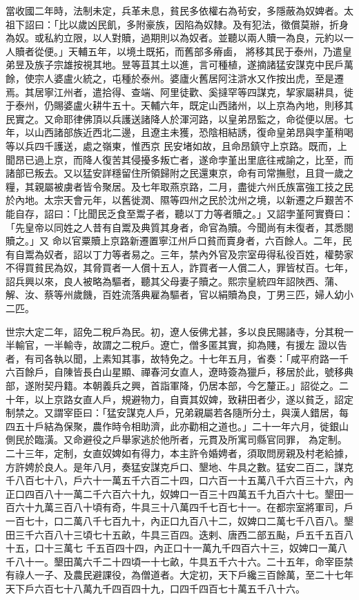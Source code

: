 \begin{pinyinscope}
 當收國二年時，法制未定，兵革未息，貧民多依權右為茍安，多隱蔽為奴婢者。太祖下詔曰：「比以歲凶民飢，多附豪族，因陷為奴隸。及有犯法，徵償莫辦，折身為奴。或私約立限，以人對贖，過期則以為奴者。並聽以兩人贖一為良，元約以一人贖者從便。」天輔五年，以境土既拓，而舊部多瘠鹵，
 將移其民于泰州，乃遣皇弟昱及族子宗雄按視其地。昱等苴其土以進，言可種植，遂摘諸猛安謀克中民戶萬餘，使宗人婆盧火統之，屯種於泰州。婆廬火舊居阿注滸水又作按出虎，至是遷焉。其居寧江州者，遣拾得、查端、阿里徒歡、奚撻罕等四謀克，挈家屬耕具，徙于泰州，仍賜婆盧火耕牛五十。天輔六年，既定山西諸州，以上京為內地，則移其民實之。又命耶律佛頂以兵護送諸降人於渾河路，以皇弟昂監之，命從便以居。七年，以山西諸部族近西北二邊，且遼主未獲，恐陰相結誘，復命皇弟昂與孛堇稍喝等以兵四千護送，處之嶺東，惟西京
 民安堵如故，且命昂鎮守上京路。既而，上聞昂已過上京，而降人復苦其侵擾多叛亡者，遂命孛堇出里底往戒諭之，比至，而諸部已叛去。又以猛安詳穩留住所領歸附之民還東京，命有司常撫慰，且貸一歲之糧，其親屬被虜者皆令聚居。及七年取燕京路，二月，盡徙六州氏族富強工技之民於內地。太宗天會元年，以舊徙潤、隰等四州之民於沈州之境，以新遷之戶艱苦不能自存，詔曰：「比聞民乏食至鬻子者，聽以丁力等者贖之。」又詔孛堇阿實賚曰：「先皇帝以同姓之人昔有自鬻及典質其身者，命官為贖。今聞尚有未復者，其悉閱贖之。」又
 命以官粟贖上京路新遷置寧江州戶口貧而賣身者，六百餘人。二年，民有自鬻為奴者，詔以丁力等者易之。三年，禁內外官及宗室毋得私役百姓，權勢家不得買貧民為奴，其脅買者一人償十五人，詐買者一人償二人，罪皆杖百。七年，詔兵興以來，良人被略為驅者，聽其父母妻子贖之。熙宗皇統四年詔陜西、蒲、解、汝、蔡等州歲饑，百姓流落典雇為驅者，官以絹贖為良，丁男三匹，婦人幼小二匹。



 世宗大定二年，詔免二稅戶為民。初，遼人佞佛尤甚，多以良民賜諸寺，分其稅一半輸官，一半輸寺，故謂之二稅戶。遼亡，僧多匿其實，抑為賤，有援左
 證以告者，有司各執以聞，上素知其事，故特免之。十七年五月，省奏：「咸平府路一千六百餘戶，自陳皆長白山星顯、禪春河女直人，遼時簽為獵戶，移居於此，號移典部，遂附契丹籍。本朝義兵之興，首詣軍降，仍居本部，今乞釐正。」詔從之。二十年，以上京路女直人戶，規避物力，自賣其奴婢，致耕田者少，遂以貧乏，詔定制禁之。又謂宰臣曰：「猛安謀克人戶，兄弟親屬若各隨所分土，與漢人錯居，每四五十戶結為保聚，農作時令相助濟，此亦勸相之道也。」二十一年六月，徙銀山側民於臨潢。又命避役之戶舉家逃於他所者，元貫及所寓司縣官同罪，
 為定制。二十三年，定制，女直奴婢如有得力，本主許令婚娉者，須取問房親及村老給據，方許娉於良人。是年八月，奏猛安謀克戶口、墾地、牛具之數。猛安二百二，謀克千八百七十八，戶六十一萬五千六百二十四，口六百一十五萬八千六百三十六，內正口四百八十一萬二千六百六十九，奴婢口一百三十四萬五千九百六十七。墾田一百六十九萬三百八十頃有奇，牛具三十八萬四千七百七十一。在都宗室將軍司，戶一百七十，口二萬八千七百九十，內正口九百八十二，奴婢口二萬七千八百八。墾田三千六百八十三頃七十五畝，牛具三百四。迭剌、唐西二部五颭，戶五千五百八十五，口十三萬七
 千五百四十四，內正口十一萬九千四百六十三，奴婢口一萬八千八十一。墾田萬六千二十四頃一十七畝，牛具五千六十六。二十五年，命宰臣禁有祿人一子、及農民避課役，為僧道者。大定初，天下戶纔三百餘萬，至二十七年天下戶六百七十八萬九千四百四十九，口四千四百七十萬五千八十六。




\end{pinyinscope}
